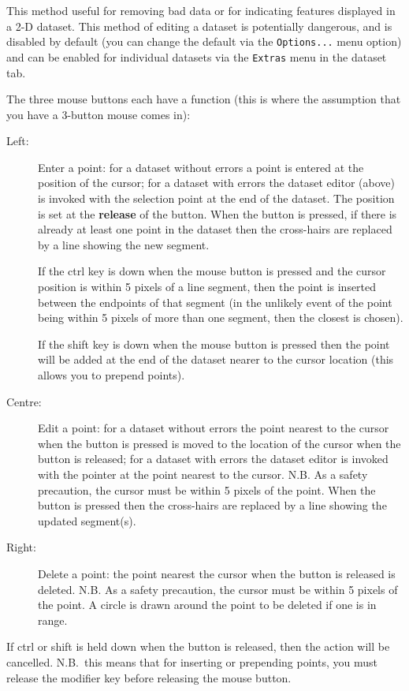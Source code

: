 \documentclass[11pt,twoside,english]{article}
\begin{document}
This method
useful for removing bad data or for indicating features displayed in a
2-D dataset. This method of editing a dataset is potentially dangerous,
and is disabled by default (you can change the default via the
\texttt{Options...} menu option) and can be enabled for individual
datasets via the \texttt{Extras} menu in the dataset tab.

The three mouse buttons each have a function (this is where the
assumption that you have a 3-button mouse comes in):

\begin{description}
\item [Left:]Enter a point: for a dataset without errors a point is
  entered at the position of the cursor; for a dataset with errors the
  dataset editor (above) is invoked with the selection point at the end
  of the dataset. The position is set at the \textbf{release} of the
  button. When the button is pressed, if there is already at least one
  point in the dataset then the cross-hairs are replaced by a line
  showing the new segment. 

  If the \textsf{ctrl} key is down when the mouse button is pressed and
  the cursor position is within 5 pixels of a line segment, then the
  point is inserted between the endpoints of that segment (in the
  unlikely event of the point being within 5 pixels of more than one
  segment, then the closest is chosen).

  If the \textsf{shift} key is down when the mouse button is pressed
  then the point will be added at the end of the dataset nearer to the
  cursor location (this allows you to prepend points).

\item [Centre:]Edit a point: for a dataset without errors the point
  nearest to the cursor when the button is pressed is moved to the
  location of the cursor when the button is released; for a dataset
  with errors the dataset editor is invoked with the pointer at the
  point nearest to the cursor. N.B. As a safety precaution, the cursor
  must be within 5 pixels of the point. When the button is pressed then
  the cross-hairs are replaced by a line showing the updated
  segment(s).
\item [Right:]Delete a point: the point nearest the cursor when the
  button is released is deleted.  N.B. As a safety precaution, the
  cursor must be within 5 pixels of the point. A circle is drawn around
  the point to be deleted if one is in range.
\end{description}
If \textsf{ctrl} or \textsf{shift} is held down when the button is
released, then the action will be cancelled. N.B.\ this means that for
inserting or prepending points, you must release the modifier key
before releasing the mouse button.
\end{document}
